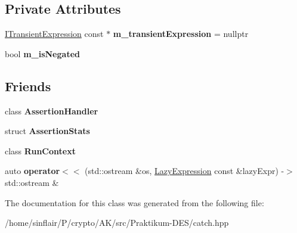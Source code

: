 \subsection*{Private Attributes}
\begin{DoxyCompactItemize}
\item 
\mbox{\label{classCatch_1_1LazyExpression_a5a9ce4c2401a262c21b4e107551180bc}} 
\hyperlink{structCatch_1_1ITransientExpression}{I\+Transient\+Expression} const  $\ast$ {\bfseries m\+\_\+transient\+Expression} = nullptr
\item 
\mbox{\label{classCatch_1_1LazyExpression_a975fdfe2bb139512024bb479d478425e}} 
bool {\bfseries m\+\_\+is\+Negated}
\end{DoxyCompactItemize}
\subsection*{Friends}
\begin{DoxyCompactItemize}
\item 
\mbox{\label{classCatch_1_1LazyExpression_a4301a3aa57b612dd8b6ef8461742ecab}} 
class {\bfseries Assertion\+Handler}
\item 
\mbox{\label{classCatch_1_1LazyExpression_a64019eb137f5ce447cdc71cb80b6e7a4}} 
struct {\bfseries Assertion\+Stats}
\item 
\mbox{\label{classCatch_1_1LazyExpression_af3aa096bb29a772bc534830f29a2ce7a}} 
class {\bfseries Run\+Context}
\item 
\mbox{\label{classCatch_1_1LazyExpression_aa01086581cab2fcd2d4580b8fa787dfc}} 
auto {\bfseries operator$<$$<$} (std\+::ostream \&os, \hyperlink{classCatch_1_1LazyExpression}{Lazy\+Expression} const \&lazy\+Expr) -\/$>$ std\+::ostream \&
\end{DoxyCompactItemize}


The documentation for this class was generated from the following file\+:\begin{DoxyCompactItemize}
\item 
/home/sinflair/\+P/crypto/\+A\+K/src/\+Praktikum-\/\+D\+E\+S/catch.\+hpp\end{DoxyCompactItemize}
